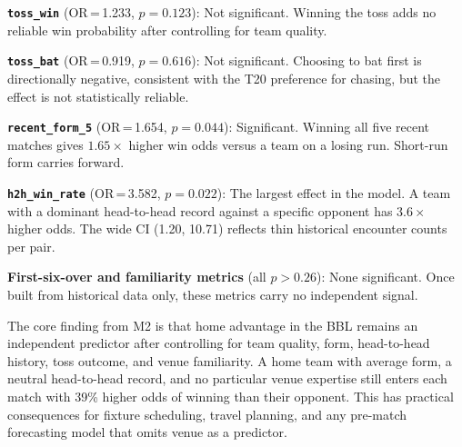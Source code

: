 \documentclass[12pt,a4paper]{article}
\begin{document}
\textbf{\texttt{toss\_win}} (OR\,=\,1.233, $p = 0.123$): Not significant. Winning the toss
adds no reliable win probability after controlling for team quality.

\textbf{\texttt{toss\_bat}} (OR\,=\,0.919, $p = 0.616$): Not significant. Choosing to bat
first is directionally negative, consistent with the T20 preference for chasing, but the
effect is not statistically reliable.

\textbf{\texttt{recent\_form\_5}} (OR\,=\,1.654, $p = 0.044$): Significant. Winning all
five recent matches gives $1.65\times$ higher win odds versus a team on a losing run.
Short-run form carries forward.

\textbf{\texttt{h2h\_win\_rate}} (OR\,=\,3.582, $p = 0.022$): The largest effect in the
model. A team with a dominant head-to-head record against a specific opponent has $3.6\times$
higher odds. The wide CI (1.20, 10.71) reflects thin historical encounter counts per pair.

\textbf{First-six-over and familiarity metrics} (all $p > 0.26$): None significant. Once built
from historical data only, these metrics carry no independent signal.

The core finding from M2 is that home advantage in the BBL remains an independent predictor
after controlling for team quality, form, head-to-head history, toss outcome, and venue
familiarity. A home team with average form, a neutral head-to-head record, and no particular
venue expertise still enters each match with 39\% higher odds of winning than their opponent. This has practical consequences for fixture scheduling, travel
planning, and any pre-match forecasting model that omits venue as a predictor.
\end{document}
